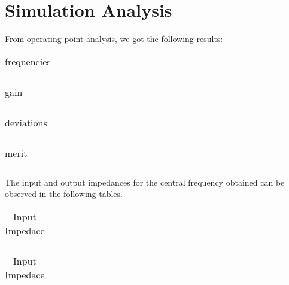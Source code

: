 \section{Simulation Analysis}
\label{sec:simulation} 

From operating point analysis, we got the following results:
\FloatBarrier
\begin{table}[h]
  \centering
  \begin{tabular}{|c|c|c|c|c|}
    \hline    
    
    \hline
  \end{tabular}
  \caption{frequencies}
  \label{tab:Spice1}
\end{table}
\FloatBarrier 
\begin{table}[h]
  \centering
  \begin{tabular}{|c|c|c|c|c|}
    \hline    
    
    \hline
  \end{tabular}
  \caption{gain}
  \label{tab:Spice1}
\end{table}
\FloatBarrier
\begin{table}[h]
  \centering
  \begin{tabular}{|c|c|c|c|c|}
    \hline    
    
    \hline
  \end{tabular}
  \caption{deviations}
  \label{tab:Spice1}
\end{table}
\FloatBarrier 
\begin{table}[h]
  \centering
  \begin{tabular}{|c|c|c|c|}
    \hline    
    
    \hline
  \end{tabular}
  \caption{merit}
  \label{tab:Spice1}
\end{table}
\FloatBarrier  

The input and output impedances for the central frequency obtained can be observed in the following tables.

\FloatBarrier
\begin{table}[h]
  \centering
  \begin{tabular}{|c|c|c|}
    \hline    
    
    \hline
  \end{tabular}
  \caption{Input Impedace}
  \label{tab:Spice1}
\end{table}
\FloatBarrier 
\begin{table}[h]
  \centering
  \begin{tabular}{|c|c|}
    \hline    
    
    \hline
  \end{tabular}
  \caption{Input Impedace}
  \label{tab:Spice1}
\end{table}
\FloatBarrier  

